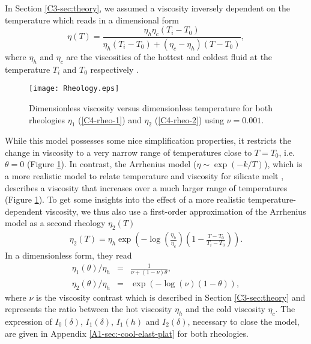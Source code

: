 In  Section  \ref{C3-sec:theory},  we assumed  a  viscosity  inversely
dependent on the temperature which reads in a dimensional form
\begin{equation}
  \eta(T)=\frac{\eta_h
    \eta_c(T_i-T_0)}{\eta_h(T_i-T_0)+(\eta_c-\eta_h)(T-T_0)},
\end{equation}
where $\eta_h$  and $\eta_c$  are the viscosities  of the  hottest and
coldest  fluid  at  the   temperature  $T_i$  and  $T_0$  respectively
\citep{Bercovici:2007vc}.
\begin{figure}[h!]
  \begin{center}
    \graphicspath{ {/Users/thorey/Documents/These/Projet/Refroidissement/Skin_Model/Figure/Figure_Heating/} }
    \texttt{[image: Rheology.eps]}
    \caption{Dimensionless viscosity  versus dimensionless temperature
      for  both  rheologies  $\eta_1$ (\ref{C4-rheo-1})  and  $\eta_2$
      (\ref{C4-rheo-2}) using $\nu=0.001$.}
    \label{C4-Rheology}
  \end{center}
\end{figure}
While  this model  possesses some  nice simplification  properties, it
restricts  the  change  in  viscosity   to  a  very  narrow  range  of
temperatures    close   to    $T=T_0$,   i.e.     $\theta=0$   (Figure
\ref{C4-Rheology}).     In     contrast,    the     Arrhenius    model
($\eta \sim  \exp(-k/T)$), which is  a more realistic model  to relate
temperature      and       viscosity      for       silicate      melt
\citep{Anonymous:CZVBrBvv,Blatt:2ViMWPc0,Crisp:1990gf,Costa:2003wk},
describes  a viscosity  that increases  over  a much  larger range  of
temperatures (Figure  \ref{C4-Rheology}).  To  get some  insights into
the  effect of  a more  realistic temperature-dependent  viscosity, we
thus also use a first-order approximation  of the Arrhenius model as a
second rheology $\eta_2(T)$ \citep{Diniega:2013eh}
\begin{eqnarray}
  \eta_2(T)                          =                          \eta_h
  \exp\left(-\log\left(\frac{\eta_h}{\eta_c}\right)\left(1-\frac{T-T_0}{T_i-T_0}\right)\right).
\end{eqnarray}
In a dimensionless form, they read
\begin{eqnarray}
  \eta_1(\theta)/\eta_h&=&\frac{1}{\nu+(1-\nu)\theta} ,\label{C4-rheo-1}\\
  \eta_2(\theta)/\eta_h&=&\exp\left(-\log(\nu)\left(1-\theta\right)\right),  \label{C4-rheo-2}
\end{eqnarray}
where $\nu$  is the viscosity  contrast which is described  in Section
\ref{C3-sec:theory} and represents the ratio between the hot viscosity
$\eta_h$  and   the  cold  viscosity  $\eta_c$.    The  expression  of
$I_0(\delta)$, $I_1(\delta)$, $I_1(h)$ and $I_2(\delta)$, necessary to
close the model, are  given in Appendix \ref{A1-sec:-cool-elast-plat}
  for both rheologies.

